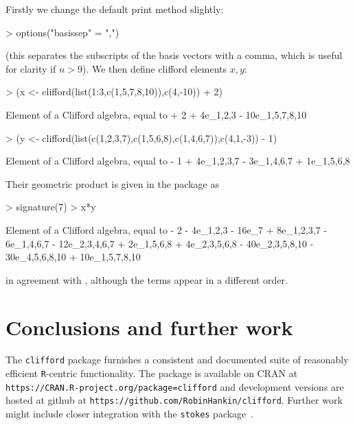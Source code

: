 \documentclass{birkjour}
\theoremstyle{definition}
\theoremstyle{remark}
\numberwithin{equation}{section}
\begin{document}
Firstly we change the default print method slightly:

\begin{Schunk}
\begin{Sinput}
> options("basissep" = ",")
\end{Sinput}
\end{Schunk}

(this separates the subscripts of the basis vectors with a comma,
which is useful for clarity if $n>9$).  We then define clifford
elements $x,y$:

\begin{Schunk}
\begin{Sinput}
> (x <- clifford(list(1:3,c(1,5,7,8,10)),c(4,-10)) + 2)
\end{Sinput}
\begin{Soutput}
Element of a Clifford algebra, equal to
+ 2 + 4e_1,2,3 - 10e_1,5,7,8,10
\end{Soutput}
\begin{Sinput}
> (y <- clifford(list(c(1,2,3,7),c(1,5,6,8),c(1,4,6,7)),c(4,1,-3)) - 1)
\end{Sinput}
\begin{Soutput}
Element of a Clifford algebra, equal to
- 1 + 4e_1,2,3,7 - 3e_1,4,6,7 + 1e_1,5,6,8
\end{Soutput}
\end{Schunk}

Their geometric product is given in the package as

\begin{Schunk}
\begin{Sinput}
> signature(7)
> x*y
\end{Sinput}
\begin{Soutput}
Element of a Clifford algebra, equal to
- 2 - 4e_1,2,3 - 16e_7 + 8e_1,2,3,7 - 6e_1,4,6,7 - 12e_2,3,4,6,7 + 2e_1,5,6,8 +
4e_2,3,5,6,8 - 40e_2,3,5,8,10 - 30e_4,5,6,8,10 + 10e_1,5,7,8,10
\end{Soutput}
\end{Schunk}

in agreement with \cite{ablamowicz2012}, although the terms appear in
a different order.

\section{Conclusions and further work}

The {\tt clifford} package furnishes a consistent and documented suite
of reasonably efficient {\tt R}-centric functionality.  The package is
available on CRAN at
\verb+https://CRAN.R-project.org/package=clifford+ and development
versions are hosted at github at
\verb+https://github.com/RobinHankin/clifford+.  Further work might
include closer integration with the {\tt stokes}
package~\cite{hankin2022_stokes_arxiv}.
\end{document}
